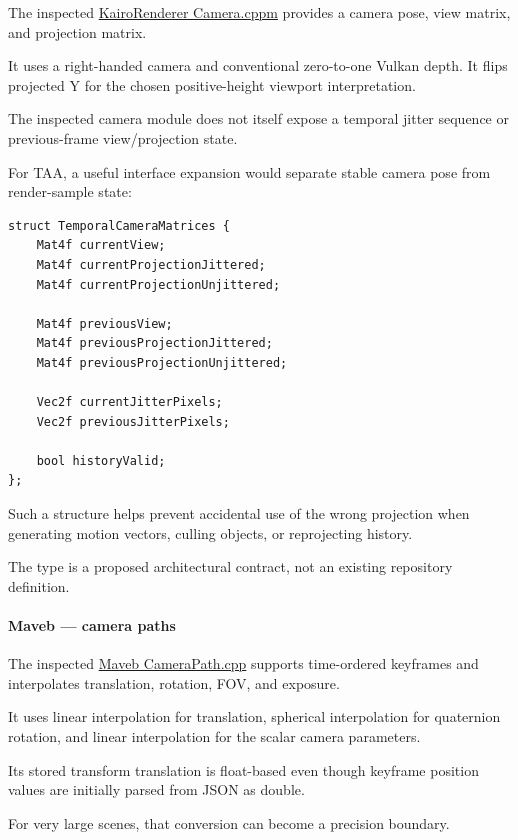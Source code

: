 The inspected \href{https://github.com/swayam8624/KairoRenderer/blob/main/Camera.cppm?utm_source=chatgpt.com}{KairoRenderer Camera.cppm} provides a camera pose, view matrix, and projection matrix.

It uses a right-handed camera and conventional zero-to-one Vulkan depth. It flips projected Y for the chosen positive-height viewport interpretation.

The inspected camera module does not itself expose a temporal jitter sequence or previous-frame view/projection state.

For TAA, a useful interface expansion would separate stable camera pose from render-sample state:

\begin{verbatim}
struct TemporalCameraMatrices {
    Mat4f currentView;
    Mat4f currentProjectionJittered;
    Mat4f currentProjectionUnjittered;

    Mat4f previousView;
    Mat4f previousProjectionJittered;
    Mat4f previousProjectionUnjittered;

    Vec2f currentJitterPixels;
    Vec2f previousJitterPixels;

    bool historyValid;
};
\end{verbatim}

Such a structure helps prevent accidental use of the wrong projection when generating motion vectors, culling objects, or reprojecting history.

The type is a proposed architectural contract, not an existing repository definition.

\paragraph{Maveb --- camera paths}\label{maveb-camera-paths}

The inspected \href{https://github.com/swayam8624/Maveb/blob/main/engine/scene/src/CameraPath.cpp?utm_source=chatgpt.com}{Maveb CameraPath.cpp} supports time-ordered keyframes and interpolates translation, rotation, FOV, and exposure.

It uses linear interpolation for translation, spherical interpolation for quaternion rotation, and linear interpolation for the scalar camera parameters.

Its stored transform translation is float-based even though keyframe position values are initially parsed from JSON as double.

For very large scenes, that conversion can become a precision boundary.

